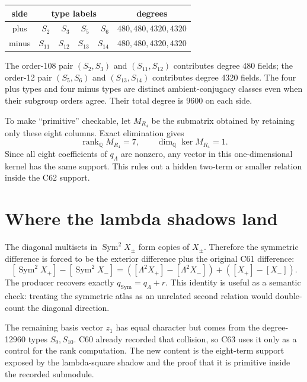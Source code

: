 \documentclass[11pt]{article}
\newcommand{\Q}{\mathbb{Q}}
\newcommand{\Sym}{\operatorname{Sym}}
\begin{document}
\begin{center}
\small
\begin{tabular}{c|rrrr|c}
\toprule
side & \multicolumn{4}{c|}{type labels} & degrees\\
\midrule
plus & $S_2$ & $S_3$ & $S_5$ & $S_6$ & $480,480,4320,4320$\\
minus & $S_{11}$ & $S_{12}$ & $S_{13}$ & $S_{14}$ & $480,480,4320,4320$\\
\bottomrule
\end{tabular}
\end{center}

The order-108 pair \((S_2,S_3)\) and \((S_{11},S_{12})\) contributes degree
480 fields; the order-12 pair \((S_5,S_6)\) and \((S_{13},S_{14})\) contributes
degree 4320 fields.  The four plus types and four minus types are distinct
ambient-conjugacy classes even when their subgroup orders agree.  Their total
degree is 9600 on each side.

To make ``primitive'' checkable, let \(M_{R_4}\) be the submatrix obtained by
retaining only these eight columns.  Exact elimination gives
\[
 \operatorname{rank}_{\Q}M_{R_4}=7,
 \qquad \dim_{\Q}\ker M_{R_4}=1.
\]
Since all eight coefficients of \(q_\Lambda\) are nonzero, any vector in
this one-dimensional kernel has the same support.  This rules out a hidden
two-term or smaller relation inside the C62 support.

\section{Where the lambda shadows land}
The diagonal multisets in \(\Sym^2X_\pm\) form copies of \(X_\pm\).  Therefore
the symmetric difference is forced to be the exterior difference plus the
original C61 difference:
\[
 [\Sym^2X_+]-[\Sym^2X_-]
 =([\Lambda^2X_+]-[\Lambda^2X_-])+([X_+]-[X_-]).
\]
The producer recovers exactly \(q_{\Sym}=q_\Lambda+r\).  This identity is
useful as a semantic check: treating the symmetric atlas as an unrelated
second relation would double-count the diagonal direction.

The remaining basis vector \(z_1\) has equal character but comes from the
degree-12960 types \(S_9,S_{10}\).  C60 already recorded that collision, so
C63 uses it only as a control for the rank computation.  The new content is
the eight-term support exposed by the lambda-square shadow and the proof that
it is primitive inside the recorded submodule.
\end{document}

